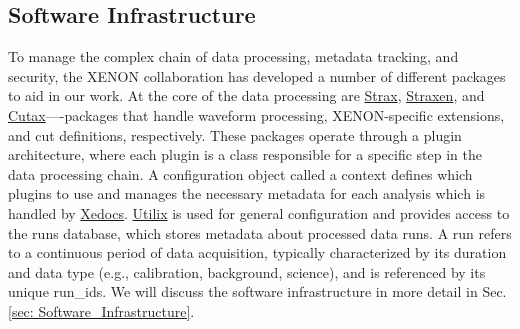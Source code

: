 \subsection{Software Infrastructure}

To manage the complex chain of data processing, metadata tracking, and security, the XENON collaboration has developed a number of different packages to aid in our work. At the core of the data processing are \hyperlink{https://github.com/AxFoundation/strax}{Strax}, \hyperlink{https://github.com/XENONnT/straxen}{Straxen}, and \hyperlink{https://github.com/XENONnT/cutax}{Cutax}—-packages that handle waveform processing, XENON-specific extensions, and cut definitions, respectively. These packages operate through a plugin architecture, where each plugin is a class responsible for a specific step in the data processing chain. A configuration object called a context defines which plugins to use and manages the necessary metadata for each analysis which is handled by \hyperlink{https://github.com/XENONnT/xedocs}{Xedocs}. \hyperlink{https://github.com/XENONnT/utilix}{Utilix} is used for general configuration and provides access to the runs database, which stores metadata about processed data runs. A run refers to a continuous period of data acquisition, typically characterized by its duration and data type (e.g., calibration, background, science), and is referenced by its unique run\_ids. We will discuss the software infrastructure in more detail in Sec. \ref{sec: Software_Infrastructure}.


